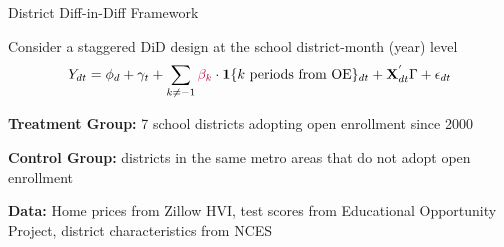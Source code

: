 \documentclass[notes,11pt, aspectratio=169]{beamer}
\newenvironment{wideitemize}{\itemize\addtolength{\itemsep}{10pt}}{\enditemize}
\begin{document}


\begin{frame}{District Diff-in-Diff Framework}
\begin{wideitemize}
\item Consider a staggered DiD design at the school district-month (year) level\[Y_{dt} = \phi_d + \gamma_t + \sum_{k \ne -1 } \textcolor{purple}{\beta_k} \cdot \mathbf{1}\{\text{$k$ periods from OE}\}_{dt} + \mathbf{X}_{dt}^{'} \Gamma + \epsilon_{dt} \]
\item \textbf{Treatment Group:} 7 school districts adopting open enrollment since 2000
\item \textbf{Control Group:} districts in the same metro areas that do not adopt open enrollment
\item \textbf{Data:} Home prices from Zillow HVI, test scores from Educational Opportunity Project, district characteristics from NCES
\end{wideitemize}
\end{frame}
\end{document}
